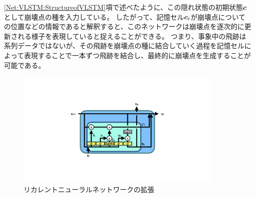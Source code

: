 \ref{Net:VLSTM:StructureofVLSTM}項で述べたように、この隠れ状態の初期状態${\mbox{\boldmath{$c$}}}$として崩壊点の種を入力している。
したがって、記憶セル${\mbox{\boldmath{$c$}}}_{t}$が崩壊点についての位置などの情報であると解釈すると、このネットワークは崩壊点を逐次的に更新される様子を表現していると捉えることができる。
つまり、事象中の飛跡は系列データではないが、その飛跡を崩壊点の種に結合していく過程を記憶セルによって表現することで一本ずつ飛跡を結合し、最終的に崩壊点を生成することが可能である。

\begin{figure}[htbp]
 \centering
 \includegraphics[trim = 200 200 200 50, width=0.9\textwidth]{Figure/3Networks/3-4-2-1VLSTMStructure.png}
 \caption{リカレントニューラルネットワークの拡張}
 \label{3-4-2-1VLSTMStructure}
\end{figure}

